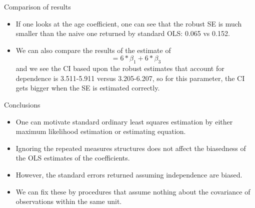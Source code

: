 \documentclass[ignorenonframetext,]{beamer}
\providecommand{\tightlist}{%
  \setlength{\itemsep}{0pt}\setlength{\parskip}{0pt}}
\begin{document}
\begin{frame}{Comparison of results}

\begin{itemize}
\tightlist
\item
  If one looks at the age coefficient, one can see that the robust SE is
  much smaller than the naive one returned by standard OLS: 0.065 vs
  0.152.\\
\item
  We can also compare the results of the estimate of\\
  \[ =  6*\beta_1 + 6*\beta_3\] and we see the CI based upon the robust
  estimates that account for dependence is 3.511-5.911 versus
  3.205-6.207, so for this parameter, the CI gets bigger when the SE is
  estimated correctly.
\end{itemize}

\end{frame}

\begin{frame}{Conclusions}

\begin{itemize}
\tightlist
\item
  One can motivate standard ordinary least squares estimation by either
  maximum likelihood estimation or estimating equation.
\item
  Ignoring the repeated measures structures does not affect the
  biasedness of the OLS estimates of the coefficients.
\item
  However, the standard errors returned assuming independence are
  biased.
\item
  We can fix these by procedures that assume nothing about the
  covariance of observations within the same unit.
\end{itemize}

\end{frame}
\end{document}
